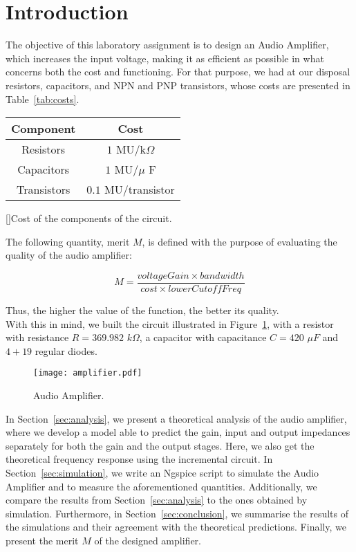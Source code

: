 \section{Introduction}
\label{sec:introduction}

The objective of this laboratory assignment is to design an Audio Amplifier, which increases the input voltage, making it as efficient as possible in what concerns both the cost and functioning. For that purpose, we had at our disposal resistors, capacitors, and NPN and PNP transistors, whose costs are presented in Table~\ref{tab:costs}.

\begin{center}
\begin{tabular}{ | c | c | }\label{tab:costs}
Component & Cost \\
\hline
Resistors & $1$ MU/k$\Omega$ \\  
Capacitors & $1$ MU/$\mu$ F \\
Transistors & $0.1$ MU/transistor    
\end{tabular}
[]{Cost of the components of the circuit.}
\end{center}

The following quantity, merit $M$, is defined with the purpose of evaluating the quality of the audio amplifier:

\begin{equation}
  M = \frac{voltageGain \times bandwidth}{cost \times lowerCutoffFreq}
\end{equation}

Thus, the higher the value of the function, the better its quality.\\

With this in mind, we built the circuit illustrated in Figure~\ref{fig:amplifier}, with a resistor with resistance $R = 369.982$ $k\Omega$, a capacitor with capacitance $C = 420$ $\mu F$ and $4+19$ regular diodes.

\begin{figure}[H] \centering
\texttt{[image: amplifier.pdf]}
\caption{Audio Amplifier.}
\label{fig:amplifier}
\end{figure}

In Section~\ref{sec:analysis}, we present a theoretical analysis of the audio amplifier, where we develop a model able to predict the gain, input and output impedances separately for both the gain and the output stages. Here, we also get the theoretical frequency response using the incremental circuit. In Section~\ref{sec:simulation}, we write an Ngspice script to simulate the Audio Amplifier and to measure the aforementioned quantities. Additionally, we compare the results from Section~\ref{sec:analysis} to the ones obtained by simulation. Furthermore, in Section~\ref{sec:conclusion}, we summarise the results of the simulations and their agreement with the theoretical predictions. Finally, we present the merit $M$ of the designed amplifier.

